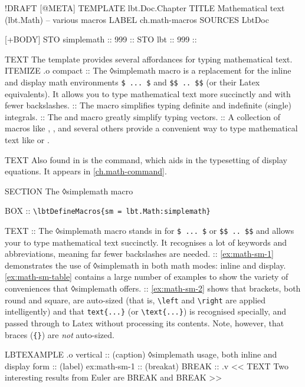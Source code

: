 \begin{lbt}
  !DRAFT
  [@META]
    TEMPLATE lbt.Doc.Chapter
    TITLE Mathematical text \textsf{(lbt.Math)} -- various macros
    LABEL ch.math-macros
    SOURCES LbtDoc

  [+BODY]
    STO simplemath :: 999 :: 
    STO lbt :: 999 :: \lbtlogo{}

    TEXT The  template provides several affordances for typing mathematical text.
    ITEMIZE .o compact
    :: The ◊simplemath macro is a replacement for the inline and display math environments \Verb|$ ... $| and \Verb|$$ .. $$| (or their Latex equivalents). It allows you to type mathematical text more succinctly and with fewer backslashes.
    :: The  macro simplifies typing definite and indefinite (single) integrals.
    :: The  and  macro greatly simplify typing vectors.
    :: A collection of macros like , ,  and several others provide a convenient way to type mathematical text like  or .

    TEXT Also found in  is the  command, which aids in the typesetting of display equations. It appears in \cref{ch.math-command}.

    SECTION The ◊simplemath macro

    BOX :: \verb|\lbtDefineMacros{sm = lbt.Math:simplemath}|

    TEXT
    :: The ◊simplemath macro stands in for \Verb|$ ... $| or \Verb|$$ .. $$| and allows your to type mathematical text succinctly. It recognises a lot of keywords and abbreviations, meaning far fewer backslashes are needed.
    :: \cref{ex:math-sm-1} demonstrates the use of ◊simplemath in both math modes: inline and display. \cref{ex:math-sm-table} contains a large number of examples to show the variety of conveniences that ◊simplemath offers.
    :: \cref{ex:math-sm-2} shows that brackets, both round and square, are auto-sized (that is, \Verb|\left| and \Verb|\right| are applied intelligently) and that \Verb|text{...}| (or \Verb|\text{...}|) is recognised specially, and passed through to Latex without processing its contents. Note, however, that braces (\Verb|{}|) are \emph{not} auto-sized.

    LBTEXAMPLE .o vertical
    :: (caption) ◊simplemath usage, both inline and display form
    :: (label) ex:math-sm-1
    :: (breakat) BREAK
    :: .v <<
      TEXT Two interesting results from Euler are BREAK  and BREAK 
    >>


\end{lbt}
